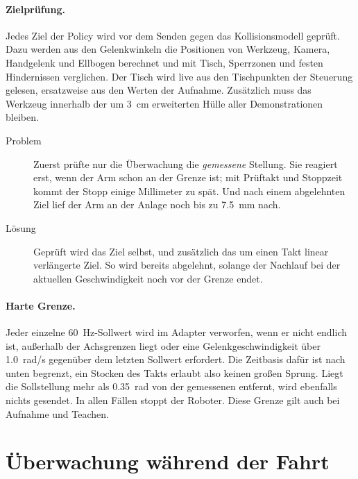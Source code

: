 \paragraph{Zielprüfung.} Jedes Ziel der Policy wird vor dem Senden gegen das Kollisionsmodell
geprüft. Dazu werden aus den Gelenkwinkeln die Positionen von Werkzeug, Kamera, Handgelenk und
Ellbogen berechnet und mit Tisch, Sperrzonen und festen Hindernissen verglichen. Der Tisch
wird live aus den Tischpunkten der Steuerung gelesen, ersatzweise aus den Werten der Aufnahme.
Zusätzlich muss das Werkzeug innerhalb der um \SI{3}{\centi\metre} erweiterten Hülle aller
Demonstrationen bleiben.

\begin{description}
  \item[Problem] Zuerst prüfte nur die Überwachung die \emph{gemessene} Stellung. Sie reagiert
    erst, wenn der Arm schon an der Grenze ist; mit Prüftakt und Stoppzeit kommt der Stopp
    einige Millimeter zu spät. Und nach einem abgelehnten Ziel lief der Arm an der Anlage noch
    bis zu \SI{7.5}{\milli\metre} nach.
  \item[Lösung] Geprüft wird das Ziel selbst, und zusätzlich das um einen Takt linear
    verlängerte Ziel. So wird bereits abgelehnt, solange der Nachlauf bei der aktuellen
    Geschwindigkeit noch vor der Grenze endet.
\end{description}

\paragraph{Harte Grenze.} Jeder einzelne \SI{60}{\hertz}-Sollwert wird im Adapter verworfen,
wenn er nicht endlich ist, außerhalb der Achsgrenzen liegt oder eine Gelenkgeschwindigkeit
über \SI{1.0}{rad/s} gegenüber dem letzten Sollwert erfordert. Die Zeitbasis dafür ist nach
unten begrenzt, ein Stocken des Takts erlaubt also keinen großen Sprung. Liegt die
Sollstellung mehr als \SI{0.35}{rad} von der gemessenen entfernt, wird ebenfalls nichts
gesendet. In allen Fällen stoppt der Roboter. Diese Grenze gilt auch bei Aufnahme und Teachen.

\section{Überwachung während der Fahrt}
\label{sec:ueberwachung}

